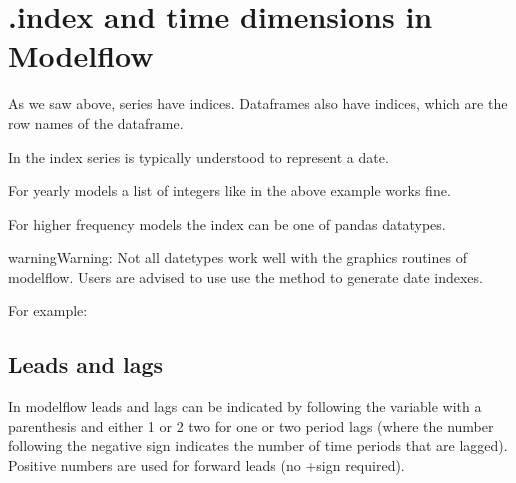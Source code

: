 \documentclass[letterpaper,10pt,english]{jupyterBook}
\begin{document}
\section{.index and time dimensions in Modelflow}
\label{\detokenize{content/04_PythonEssentials/PythonPackagesEtc:index-and-time-dimensions-in-modelflow}}
\sphinxAtStartPar
As we saw above, series have indices.  Dataframes also have indices, which are the row names of the dataframe.

\sphinxAtStartPar
In  the index series is typically understood to represent a date.

\sphinxAtStartPar
For yearly models a list of integers like in the above example works fine.

\sphinxAtStartPar
For higher frequency models the index can be one of pandas datatypes.

\begin{sphinxadmonition}{warning}{Warning:}
\sphinxAtStartPar
Not all datetypes work well with the graphics routines of modelflow.  Users are advised to use use the  method to generate date indexes.

\sphinxAtStartPar
For example:

\begin{sphinxVerbatim}[commandchars=\\\{\}]
  
\end{sphinxVerbatim}
\end{sphinxadmonition}


\subsection{Leads and lags}
\label{\detokenize{content/04_PythonEssentials/PythonPackagesEtc:leads-and-lags}}
\sphinxAtStartPar
In modelflow leads and lags can be indicated by following the variable with a parenthesis and either \sphinxhyphen{}1 or \sphinxhyphen{}2 two for one or two period lags (where the number following the negative sign indicates the number of time periods that are lagged). Positive numbers are used for forward leads (no +sign required).
\end{document}
